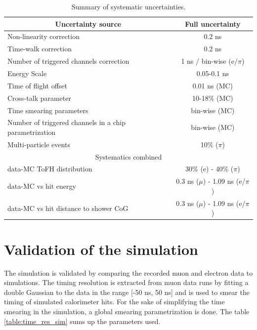 \begin{table}[htb!]
	\centering
	\caption{Summary of systematic uncertainties.}
	\label{table:time_syst}
	\begin{tabular}{@{} lc @{}}
		\toprule
		\multicolumn{1}{c}{Uncertainty source} & Full uncertainty \\
		\midrule
		Non-linearity correction & 0.2 ns \\
		Time-walk correction & 0.2 ns \\
		Number of triggered channels correction & 1 ns / bin-wise (e/$\pi$)\\
		Energy Scale & 0.05-0.1 ns \\
		Time of flight offset & 0.01 ns (MC) \\
		Cross-talk parameter & 10-18\% (MC)\\
		Time smearing parameters & bin-wise (MC)\\
		Number of triggered channels in a chip parametrization & bin-wise (MC)\\
		Multi-particle events & 10\% ($\pi$) \\
		\midrule
		\midrule
		\multicolumn{2}{c}{Systematics combined} \\
		\midrule
		data-MC ToFH distribution & 30\% (e) - 40\% ($\pi$) \\
		data-MC vs hit energy & 0.3 ns ($\mu$) - 1.09 ns (e/$\pi$)\\
		data-MC vs hit distance to shower CoG & 0.3 ns ($\mu$) - 1.09 ns (e/$\pi$)\\
		\bottomrule
	\end{tabular}
\end{table}

\section{Validation of the simulation}

The simulation is validated by comparing the recorded muon and electron data to simulations. The timing resolution is extracted from muon data runs by fitting a double Gaussian to the data in the range [-50 ns, 50 ns] and is used to smear the timing of simulated calorimeter hits. For the sake of simplifying the time smearing in the simulation, a global smearing parametrization is done. The table \ref{table:time_res_sim} sums up the parameters used.


